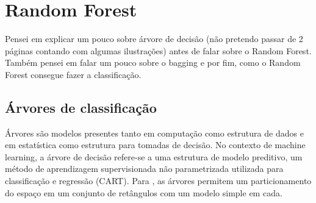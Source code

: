 \section{Random Forest}

\begin{mdframed}[backgroundcolor=blue!20] 
        Pensei em explicar um pouco sobre árvore de decisão (não pretendo passar de 2 páginas contando com algumas ilustrações) antes de falar sobre o Random Forest. Também pensei em falar um pouco sobre o bagging e por fim, como o Random Forest consegue fazer a classificação.
\end{mdframed}

\subsection{Árvores de classificação}

Árvores são modelos presentes tanto em computação como estrutura de dados e em estatística como estrutura para tomadas de decisão. No contexto de machine learning, a árvore de decisão refere-se a uma estrutura de modelo preditivo, um método de aprendizagem supervisionada não parametrizada utilizada para classificação e regressão (CART). Para , as árvores permitem um particionamento do espaço em um conjunto de retângulos com um modelo simple em cada. 

\begin{comment}
//por figura
Legenda
Neste exemplo \cite{HASTIE}, observa-se que o particionamento num espaço bidimensional, gerando 5 regiões. Ao lado, está a árvore que gerou esse particionamento.
Trata-se de uma representação de regras que dividem as observações em grupos com características em comum. Em geral, considera-se a hipótese de que cada característica possui um domínio finito e discreto.
\end{comment}

